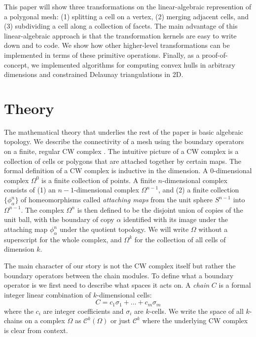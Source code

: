 \documentclass[twocolumn]{article}
\begin{document}
This paper will show three transformations on the linear-algebraic represention of a polygonal mesh: (1) splitting a cell on a vertex, (2) merging adjacent cells, and (3) subdividing a cell along a collection of facets.
The main advantage of this linear-algebraic approach is that the transformation kernels are easy to write down and to code.
We show how other higher-level transformations can be implemented in terms of these primitive operations.
Finally, as a proof-of-concept, we implemented algorithms for computing convex hulls in arbitrary dimensions and constrained Delaunay triangulations in 2D.


\section{Theory}

The mathematical theory that underlies the rest of the paper is basic algebraic topology.
We describe the connectivity of a mesh using the boundary operators on a finite, regular CW complex \cite{hatcher2002algebraic}.
The intuitive picture of a CW complex is a collection of cells or polygons that are attached together by certain maps.
The formal definition of a CW complex is inductive in the dimension.
A 0-dimensional complex $\Omega^0$ is a finite collection of points.
A finite $n$-dimensional complex consists of (1) an $n - 1$-dimensional complex $\Omega^{n - 1}$, and (2) a finite collection $\{\phi_\alpha^n\}$ of homeomorphisms called \emph{attaching maps} from the unit sphere $S^{n - 1}$ into $\Omega^{n - 1}$.
The complex $\Omega^n$ is then defined to be the disjoint union of copies of the unit ball, with the boundary of copy $\alpha$ identified with its image under the attaching map $\phi_\alpha^n$ under the quotient topology.
We will write $\Omega$ without a superscript for the whole complex, and $\Omega^k$ for the collection of all cells of dimension $k$.

The main character of our story is not the CW complex itself but rather the boundary operators between the chain modules.
To define what a boundary operator is we first need to describe what spaces it acts on.
A \emph{chain} $C$ is a formal integer linear combination of $k$-dimensional cells:
\begin{equation}
    C = c_1\sigma_1 + \ldots + c_m\sigma_m
\end{equation}
where the $c_i$ are integer coefficients and $\sigma_i$ are $k$-cells.
We write the space of all $k$-chains on a complex $\Omega$ as $\mathscr{C}^k(\Omega)$ or just $\mathscr{C}^k$ where the underlying CW complex is clear from context.
\end{document}
